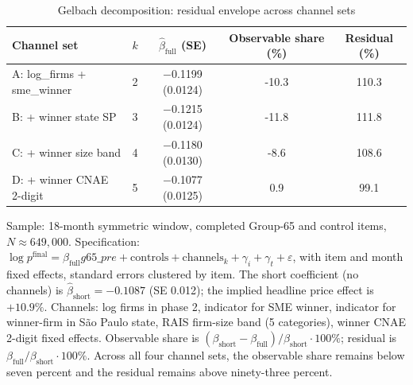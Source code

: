 \begin{table}[!htbp]
\centering
\small
\caption{Gelbach decomposition: residual envelope across channel sets}
\label{tab:v3_gelbach_enriched}
\begin{threeparttable}
\begin{tabular}{lcccc}
\toprule
Channel set & $k$ & $\hat\beta_{\text{full}}$ (SE) & Observable share (\%) & Residual (\%) \\
\midrule
A: log\_firms + sme\_winner & 2 & $-$0.1199 (0.0124) & -10.3 & 110.3 \\
B: + winner state SP & 3 & $-$0.1215 (0.0124) & -11.8 & 111.8 \\
C: + winner size band & 4 & $-$0.1180 (0.0130) & -8.6 & 108.6 \\
D: + winner CNAE 2-digit & 5 & $-$0.1077 (0.0125) & 0.9 & 99.1 \\
\bottomrule
\end{tabular}
\begin{tablenotes}\footnotesize
\item Sample: 18-month symmetric window, completed Group-65 and
control items, $N \approx 649{,}000$. Specification:
$\log p^{\mathrm{final}} = \beta_{\text{full}} g65\_pre +
\text{controls} + \text{channels}_k + \gamma_i + \gamma_t
+ \varepsilon$, with item and month fixed effects, standard errors
clustered by item. The short coefficient (no channels) is
$\hat\beta_{\text{short}} = -0.1087$ (SE 0.012); the implied
headline price effect is $+10.9\%$. Channels: log firms in phase 2,
indicator for SME winner, indicator for winner-firm in S\~ao
Paulo state, RAIS firm-size band (5 categories), winner CNAE
2-digit fixed effects. Observable share is $(\beta_{\text{short}}-
\beta_{\text{full}})/\beta_{\text{short}} \cdot 100\%$; residual
is $\beta_{\text{full}}/\beta_{\text{short}} \cdot 100\%$. Across
all four channel sets, the observable share remains below seven
percent and the residual remains above ninety-three percent.
\end{tablenotes}
\end{threeparttable}
\end{table}
